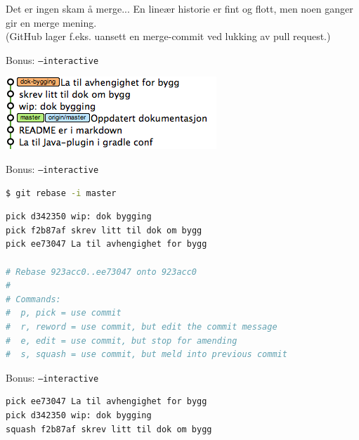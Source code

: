 \documentclass{beamer}
\begin{document}
\begin{frame}{Det er ingen skam å merge...}
    En lineær historie er fint og flott, men noen ganger gir en merge mening.\\
    \pause
    \medskip
    (GitHub lager f.eks. uansett en merge-commit ved lukking av pull request.)
\end{frame}

\begin{frame}{Bonus: \texttt{--interactive}}
    \begin{center}
        \includegraphics[scale=0.7]{6.png}
    \end{center}
\end{frame}

\begin{frame}[fragile]{Bonus: \texttt{--interactive}}
    \begin{lstlisting}[language=bash]
      $ git rebase -i master
    \end{lstlisting}
    \begin{lstlisting}[language=bash]
pick d342350 wip: dok bygging                             
pick f2b87af skrev litt til dok om bygg                   
pick ee73047 La til avhengighet for bygg                  
                                                          
# Rebase 923acc0..ee73047 onto 923acc0                    
#                                                         
# Commands:                                               
#  p, pick = use commit                                   
#  r, reword = use commit, but edit the commit message    
#  e, edit = use commit, but stop for amending            
#  s, squash = use commit, but meld into previous commit
    \end{lstlisting}
\end{frame}

\begin{frame}[fragile]{Bonus: \texttt{--interactive}}
    \begin{lstlisting}[language=bash]
pick ee73047 La til avhengighet for bygg                  
pick d342350 wip: dok bygging                             
squash f2b87af skrev litt til dok om bygg                   
    \end{lstlisting}
\end{frame}
\end{document}

